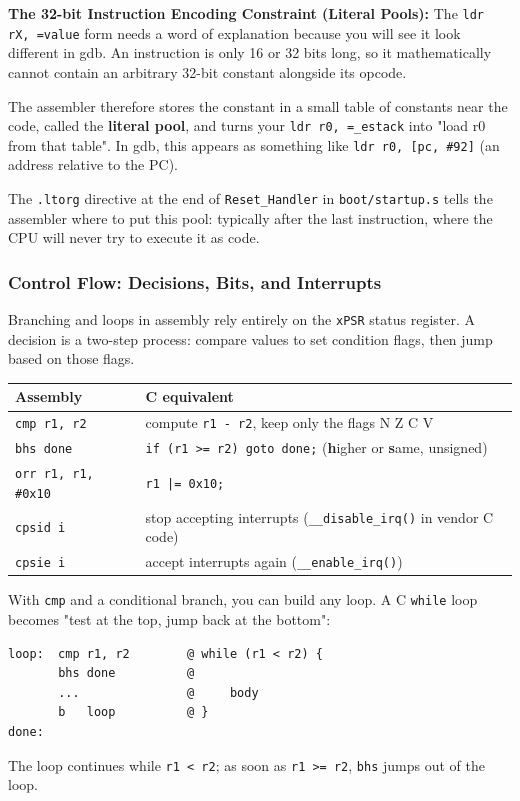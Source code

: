 \textbf{The 32-bit Instruction Encoding Constraint (Literal Pools):} 
The \texttt{ldr rX, =value} form needs a word of explanation because you will see it look different in gdb. An instruction is only 16 or 32 bits long, so it mathematically cannot contain an arbitrary 32-bit constant alongside its opcode. 

The assembler therefore stores the constant in a small table of constants near the code, called the \textbf{literal pool}, and turns your \texttt{ldr r0, =\_estack} into "load r0 from that table". In gdb, this appears as something like \texttt{ldr r0, [pc, \#92]} (an address relative to the PC). 

The \texttt{.ltorg} directive at the end of \texttt{Reset\_Handler} in \texttt{boot/startup.s} tells the assembler where to put this pool: typically after the last instruction, where the CPU will never try to execute it as code.

\subsubsection{Control Flow: Decisions, Bits, and Interrupts}
Branching and loops in assembly rely entirely on the \texttt{xPSR} status register. A decision is a two-step process: compare values to set condition flags, then jump based on those flags.

\begin{table}[h!]
    \centering
    \begin{tabular}{|l|l|}
        \hline
        \textbf{Assembly} & \textbf{C equivalent} \\ \hline
        \texttt{cmp r1, r2} & compute \texttt{r1 - r2}, keep only the flags N Z C V \\ \hline
        \texttt{bhs done} & \texttt{if (r1 >= r2) goto done;} (\textbf{h}igher or \textbf{s}ame, unsigned) \\ \hline
        \texttt{orr r1, r1, \#0x10} & \texttt{r1 |= 0x10;} \\ \hline
        \texttt{cpsid i} & stop accepting interrupts (\texttt{\_\_disable\_irq()} in vendor C code) \\ \hline
        \texttt{cpsie i} & accept interrupts again (\texttt{\_\_enable\_irq()}) \\ \hline
    \end{tabular}
\end{table}

With \texttt{cmp} and a conditional branch, you can build any loop. A C \texttt{while} loop becomes "test at the top, jump back at the bottom":
\begin{lstlisting}
loop:  cmp r1, r2        @ while (r1 < r2) {
       bhs done          @
       ...               @     body
       b   loop          @ }
done:
\end{lstlisting}
The loop continues while \texttt{r1 < r2}; as soon as \texttt{r1 >= r2}, \texttt{bhs} jumps out of the loop.

